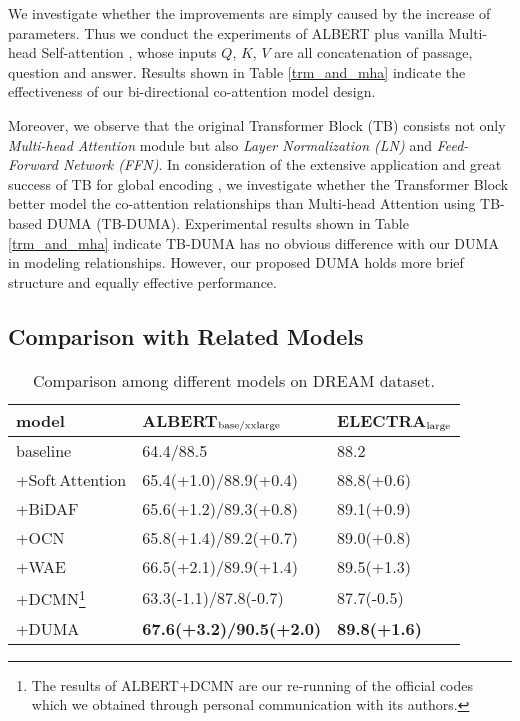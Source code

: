 \documentclass[letterpaper]{article} \usepackage{aaai21}  \usepackage{times}  \usepackage{helvet} \usepackage{courier}  \usepackage[hyphens]{url}  \usepackage{graphicx} \urlstyle{rm} \def\UrlFont{\rm}  \usepackage{natbib}  \usepackage{caption} \frenchspacing  \setlength{\pdfpagewidth}{8.5in}  \setlength{\pdfpageheight}{11in}
\begin{document}
We investigate whether the improvements are simply caused by the increase of parameters. Thus we conduct the experiments of ALBERT plus vanilla Multi-head Self-attention \cite{transformer}, whose inputs $Q$, $K$, $V$ are all concatenation of passage, question and answer. Results shown in Table \ref{trm_and_mha} indicate the effectiveness of our bi-directional co-attention model design.

Moreover, we observe that the original Transformer Block (TB) \cite{transformer} consists not only \textit{Multi-head Attention} module but also \textit{Layer Normalization (LN)} and \textit{Feed-Forward Network (FFN)}.  In consideration of the extensive application and great success of TB for global encoding \cite{bert,roberta,albert}, we investigate whether the Transformer Block better model the co-attention relationships than Multi-head Attention using TB-based DUMA (TB-DUMA). Experimental results shown in Table \ref{trm_and_mha} indicate TB-DUMA has no obvious difference with our DUMA in modeling relationships. However, our proposed DUMA holds more brief structure and equally effective performance.


\subsection{Comparison with Related Models}
\begin{table}[t]\small
\renewcommand\arraystretch{1.3}
	\centering
	{
		\begin{tabular}{@{}p{2.65cm}|l|p{1.85cm}}
			\hline		
			 model & ALBERT$_{\rm base/xxlarge}$  & ELECTRA$_{\rm large}$   \\
			\hline
			\hline
			baseline & 64.4/88.5 & 88.2	 \\
			\hline
			+Soft\,Attention\shortcite{nmt_attention}& 65.4(+1.0)/88.9(+0.4) & 88.8(+0.6) \\
			+BiDAF\shortcite{bidaf} & 65.6(+1.2)/89.3(+0.8) & 89.1(+0.9)\\
			+OCN\shortcite{ocn} &65.8(+1.4)/89.2(+0.7)  & 89.0(+0.8) \\
			+WAE\shortcite{bert_wae} & 66.5(+2.1)/89.9(+1.4) & 89.5(+1.3) \\
			
			+DCMN\footnote{The results of ALBERT+DCMN are our re-running of the official codes which we obtained through personal communication with its authors.}\shortcite{dcmn} & 63.3(-1.1)/87.8(-0.7)  & 87.7(-0.5)\\
			\hline
			+DUMA & \textbf{67.6(+3.2)/90.5(+2.0)} & \textbf{89.8(+1.6)}  \\
			\hline
		\end{tabular}
	}
	\caption{\label{attention_comparison} Comparison among different models on DREAM dataset.}
\end{table}
\end{document}
